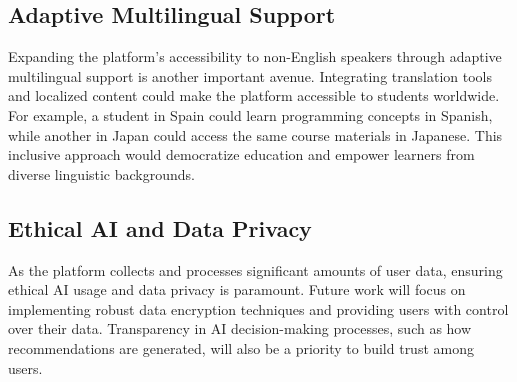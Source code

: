 \subsection{Adaptive Multilingual Support}
Expanding the platform's accessibility to non-English speakers through adaptive multilingual support is another important avenue. Integrating translation tools and localized content could make the platform accessible to students worldwide. For example, a student in Spain could learn programming concepts in Spanish, while another in Japan could access the same course materials in Japanese. This inclusive approach would democratize education and empower learners from diverse linguistic backgrounds.

\subsection{Ethical AI and Data Privacy}
As the platform collects and processes significant amounts of user data, ensuring ethical AI usage and data privacy is paramount. Future work will focus on implementing robust data encryption techniques and providing users with control over their data. Transparency in AI decision-making processes, such as how recommendations are generated, will also be a priority to build trust among users.
